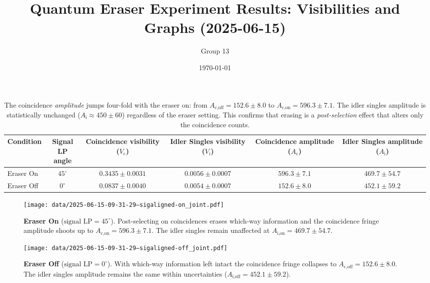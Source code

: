 \documentclass[twocolumn]{article}
\title{Quantum Eraser Experiment Results: Visibilities and Graphs (2025-06-15)}
\author{Group 13} %
\date{\today}
\begin{document}
\pagestyle{empty} %

\begin{table}[h!]
\centering
\begin{tabular}{lccccc}
\toprule
Condition & \makecell{Signal \\ LP angle} & \makecell{Coincidence \\ visibility ($V_{\text{c}}$)} & \makecell{Idler Singles \\ visibility ($V_{\text{i}}$)} & \makecell{Coincidence \\ amplitude ($A_{\text{c}}$)} & \makecell{Idler Singles \\ amplitude ($A_{\text{i}}$)} \\
\midrule
Eraser On   & $45^\circ$ & $0.3435 \pm 0.0031$ & $0.0056 \pm 0.0007$ & $596.3 \pm 7.1$ & $469.7 \pm 54.7$ \\
Eraser Off  & $0^\circ$  & $0.0837 \pm 0.0040$ & $0.0054 \pm 0.0007$ & $152.6 \pm 8.0$ & $452.1 \pm 59.2$ \\
\bottomrule
\end{tabular}
\caption*{
  The coincidence \emph{amplitude} jumps four-fold with the eraser on: 
  from $A_{\text{c,off}} = 152.6 \pm 8.0$ to
  $A_{\text{c,on}} = 596.3 \pm 7.1$. 
  The idler singles amplitude is statistically unchanged 
  ($A_{\text{i}} \approx 450 \pm 60$) regardless of the eraser setting. 
  This confirms that erasing is a \emph{post-selection} effect that
  alters only the coincidence counts.
}
\end{table}

\begin{figure}[h!]
\centering
\texttt{[image: data/2025-06-15-09-31-29--sigaligned-on\_joint.pdf]}
\caption*{
  \textbf{Eraser On} ($\text{signal LP}=45^\circ$).  Post-selecting on coincidences
  erases which-way information and the coincidence fringe amplitude shoots up to
  $A_{\text{c,on}} = 596.3 \pm 7.1$.
  The idler singles remain unaffected at
  $A_{\text{i,on}} = 469.7 \pm 54.7$.
}
\end{figure}

\begin{figure}[h!]
\centering
\texttt{[image: data/2025-06-15-09-31-29--sigaligned-off\_joint.pdf]}
\caption*{
  \textbf{Eraser Off} ($\text{signal LP}=0^\circ$).  With which-way information left
  intact the coincidence fringe collapses to
  $A_{\text{c,off}} = 152.6 \pm 8.0$.
  The idler singles amplitude remains the same within uncertainties
  ($A_{\text{i,off}} = 452.1 \pm 59.2$).
}
\end{figure}
\end{document}
